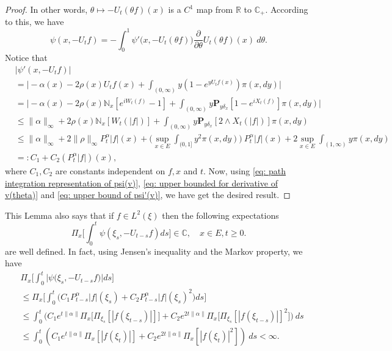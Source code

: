 \documentclass[12pt,a4paper]{amsart}
\theoremstyle{plain}
\theoremstyle{definition}
\numberwithin{equation}{section}
\begin{document}
\begin{proof}
    In other words, $\theta \mapsto -U_t(\theta f)(x)$ is a $C^1$ map from $\mathbb R$ to $\mathbb C_+$.
    According to this, we have
\begin{equation}
\label{eq: path integration representation of psi(v)}
    \psi(x,-U_tf) = -\int_0^1 \psi'\big(x,-U_t(\theta f)\big) \frac{\partial}{\partial \theta} U_t(\theta f)(x)~d\theta.
\end{equation}
    Notice that
\begin{equation}
\label{eq: upper bound of psi'(v)}
\begin{split}
    &|\psi'(x, -U_tf)|
    \\&= \Big| -\alpha(x)- 2\rho(x) U_tf(x)+ \int_{(0,\infty)} y (1- e^{y U_tf(x)} ) \pi(x,dy)\Big|
    \\&= \Big| - \alpha(x)- 2\rho(x)\mathbb N_x[e^{i W_{t}(f)} - 1]  + \int_{(0,\infty)} y \mathbf P_{y \delta_x}[1-e^{i X_{t}(f)}] \pi(x,dy) \Big|
\\ &\leq \|\alpha\|_\infty + 2\rho(x)\mathbb N_x[W_t(|f|)]+ \int_{(0,\infty)} y\mathbf P_{y\delta_x}[2\wedge X_t(|f|)] \pi(x,dy)
\\ &\leq \|\alpha\|_\infty + 2\|\rho\|_\infty
  P^\alpha_t |f|(x) + \Big(\sup_{x\in E}\int_{(0,1]}y^2 \pi(x,dy)\Big)~P^\alpha_t |f|(x)
  + 2\sup_{x\in E}\int_{(1,\infty)} y \pi(x,dy)
 \\ &=: C_1 + C_2(P^\alpha_t |f|)(x),
\end{split}
\end{equation}
    where $C_1, C_2$ are constants independent on $f,x$ and $t$.
    Now, using \eqref{eq: path integration representation of psi(v)}, \eqref{eq: upper bounded for derivative of v(theta)} and \eqref{eq: upper bound of psi'(v)}, we have get the desired result.
\end{proof}



    This Lemma also says that if $f\in L^2(\xi)$ then the following expectations
\[
    \Pi_x\Big[\int_0^t \psi(\xi_s,- U_{t-s}f)ds\Big]
    \in \mathbb C,
    \quad x\in E, t\geq 0.
\]
    are well defined.
    In fact, using Jensen's inequality and the Markov property, we have
\begin{equation}\begin{split}
\label{eq: domination of psi(v)}
    &\Pi_x\Big[\int_0^t \big|\psi \big(\xi_s,-U_{t-s}f\big)\big|ds\Big]
    \\&\leq \Pi_x\Big[\int_0^t \big(C_1 P_{t-s}^\alpha|f|(\xi_s)+C_2 P_{t-s}^\alpha|f|(\xi_s)^2\big)ds\Big]
    \\ &\leq \int_0^t \big(C_1 e^{t\|\alpha\|}\Pi_x \big[ \Pi_{\xi_s}[|f(\xi_{t-s})|] \big]+C_2 e^{2t\|\alpha\|}\Pi_x \big[ \Pi_{\xi_s}[|f (\xi_{t-s})|]^2 \big]\big)~ds
    \\ &\leq \int_0^t (C_1 e^{t\|\alpha\|}\Pi_x [ |f(\xi_{t})|]+C_2e^{2t\|\alpha\|}\Pi_x [ |f (\xi_{t})|^2 ])~ds < \infty.
\end{split}\end{equation}
\end{document}
